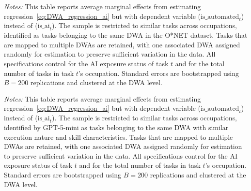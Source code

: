 \begin{table}[ht!]
\begin{center}
\caption{Effect of Neighboring Tasks' AI Execution Status on Task's AI Automation Likelihood}
\label{tab:DWA_regression_aiAutomation_mainSample}
\resizebox{\textwidth}{!}{

}
\end{center}
\footnotesize{\emph{Notes:}} 
This table reports average marginal effects from estimating regression~\eqref{eq:DWA_regression_ai} but with dependent variable ($\text{is\_automated}_{t}$) instead of ($\text{is\_ai}_{t}$).  
The sample is restricted to similar tasks across occupations, identified as tasks belonging to the same DWA in the O*NET dataset.  
Tasks that are mapped to multiple DWAs are retained, with one associated DWA assigned randomly for estimation to preserve sufficient variation in the data.  
All specifications control for the AI exposure status of task $t$ and for the total number of tasks in task $t$’s occupation.  
Standard errors are bootstrapped using $B=200$ replications and clustered at the DWA level.  
\end{table}

\begin{table}[ht!]
\begin{center}
\caption{Effect of Neighboring Tasks' AI Execution Status on Task's AI Automation Likelihood (GPT-filtered Sample)}
\label{tab:DWA_regression_aiAutomation_GPTsample}
\resizebox{\textwidth}{!}{

}
\end{center}
\footnotesize{\emph{Notes:}} 
This table reports average marginal effects from estimating regression~\eqref{eq:DWA_regression_ai} but with dependent variable ($\text{is\_automated}_{t}$) instead of ($\text{is\_ai}_{t}$).
The sample is restricted to similar tasks across occupations, identified by GPT-5-mini as tasks belonging to the same DWA with similar execution nature and skill characteristics.
Tasks that are mapped to multiple DWAs are retained, with one associated DWA assigned randomly for estimation to preserve sufficient variation in the data.  
All specifications control for the AI exposure status of task $t$ and for the total number of tasks in task $t$'s occupation.
Standard errors are bootstrapped using $B=200$ replications and clustered at the DWA level.  
\end{table}

